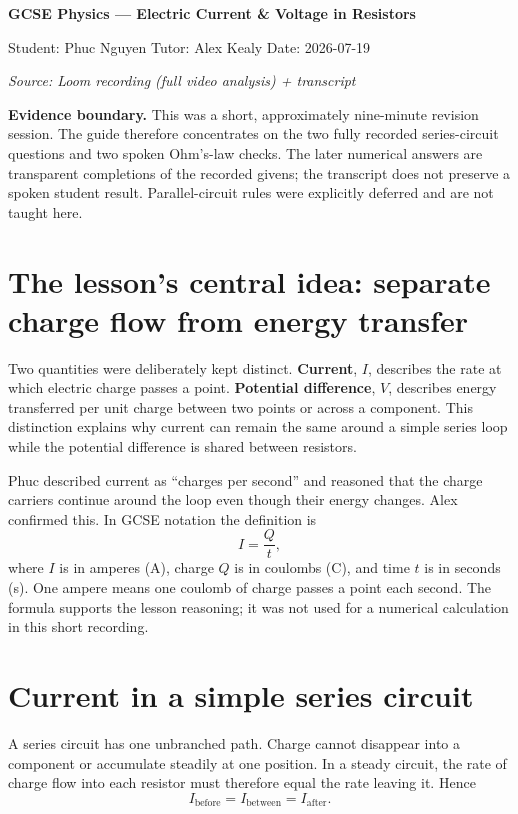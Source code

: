 \documentclass[11pt,a4paper]{article}
\newcommand{\key}[1]{\colorbox{pale}{\parbox{0.96\linewidth}{#1}}}
\begin{document}
\begin{center}
{\Huge\bfseries\color{navy} GCSE Physics — Electric Current \& Voltage in Resistors}\par\vspace{5pt}
{\large Student: Phuc Nguyen \quad Tutor: Alex Kealy \quad Date: 2026-07-19}\par\vspace{4pt}
\textit{Source: Loom recording (full video analysis) + transcript}
\end{center}
\key{\textbf{Evidence boundary.} This was a short, approximately nine-minute revision session. The guide therefore concentrates on the two fully recorded series-circuit questions and two spoken Ohm's-law checks. The later numerical answers are transparent completions of the recorded givens; the transcript does not preserve a spoken student result. Parallel-circuit rules were explicitly deferred and are not taught here.}

\section{The lesson's central idea: separate charge flow from energy transfer}
Two quantities were deliberately kept distinct. \textbf{Current}, $I$, describes the rate at which electric charge passes a point. \textbf{Potential difference}, $V$, describes energy transferred per unit charge between two points or across a component. This distinction explains why current can remain the same around a simple series loop while the potential difference is shared between resistors.

Phuc described current as ``charges per second'' and reasoned that the charge carriers continue around the loop even though their energy changes. Alex confirmed this. In GCSE notation the definition is
\[
\boxed{I=\frac{Q}{t}},
\]
where $I$ is in amperes (A), charge $Q$ is in coulombs (C), and time $t$ is in seconds (s). One ampere means one coulomb of charge passes a point each second. The formula supports the lesson reasoning; it was not used for a numerical calculation in this short recording.

\section{Current in a simple series circuit}
A series circuit has one unbranched path. Charge cannot disappear into a component or accumulate steadily at one position. In a steady circuit, the rate of charge flow into each resistor must therefore equal the rate leaving it. Hence
\[
\boxed{I_{\text{before}}=I_{\text{between}}=I_{\text{after}}}.
\]
\end{document}
